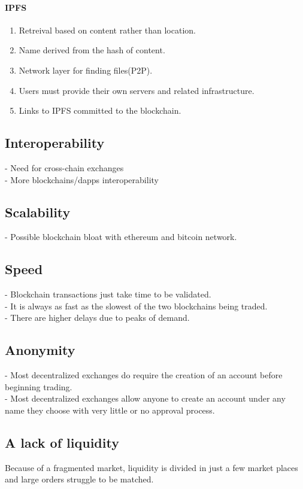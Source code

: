 \documentclass[]{article}
\begin{document}
	\paragraph{IPFS\\}
	\begin{enumerate}
	\item Retreival based on content rather than location. \\
	\item Name derived from the hash of content.\\
	\item Network layer for finding files(P2P).\\
	\item Users must provide their own servers and related infrastructure.\\
	\item Links to IPFS committed to the blockchain.\\
	\end{enumerate}
	\subsection{Interoperability}
	- Need for cross-chain exchanges  \\
	- More blockchains/dapps interoperability\\
	\subsection{Scalability}
	- Possible blockchain bloat with ethereum and bitcoin network.  
	\subsection{Speed}
	- Blockchain transactions just take time to be validated.\\ 
	- It is always as fast as the slowest of the two blockchains being traded.\\
	- There are higher delays due to peaks of demand.
	\subsection{Anonymity}
	- Most decentralized exchanges do require the creation of an account before beginning trading.\\ 
	- Most decentralized exchanges allow anyone to create an account under any name they choose with very little or no approval process.\\
	\subsection{A lack of liquidity}	
	Because of a fragmented market, liquidity is divided in just a few market places and large orders struggle to be matched.
\end{document}
